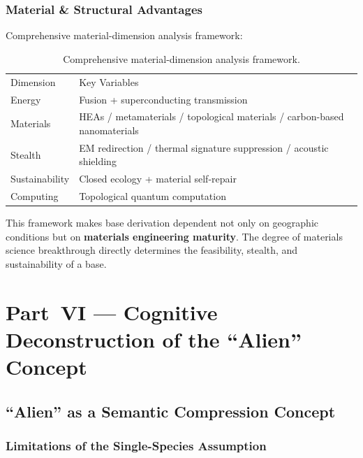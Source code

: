 \documentclass[aps,prd,twocolumn,superscriptaddress,nofootinbib]{revtex4-2}
\begin{document}
\subsubsection{Material \& Structural Advantages}\label{sec:material-advantages}

Comprehensive material-dimension analysis framework:

\begin{table}[htbp]
\caption{Comprehensive material-dimension analysis framework.}
\label{tab:material-framework}
\begin{ruledtabular}
\begin{tabular}{ll}
Dimension & Key Variables \\
\colrule
Energy & Fusion + superconducting transmission \\
Materials & HEAs / metamaterials / topological materials / carbon-based nanomaterials \\
Stealth & EM redirection / thermal signature suppression / acoustic shielding \\
Sustainability & Closed ecology + material self-repair \\
Computing & Topological quantum computation \\
\end{tabular}
\end{ruledtabular}
\end{table}

This framework makes base derivation dependent not only on geographic conditions but on \textbf{materials engineering maturity}. The degree of materials science breakthrough directly determines the feasibility, stealth, and sustainability of a base.


\section{Part~VI --- Cognitive Deconstruction of the ``Alien'' Concept}\label{sec:part6}

\subsection{``Alien'' as a Semantic Compression Concept}\label{sec:semantic-alien}

\subsubsection{Limitations of the Single-Species Assumption}\label{sec:single-species}
\end{document}
